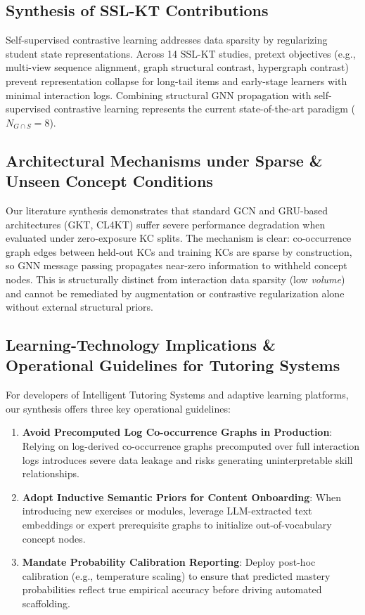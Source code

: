 \documentclass[journal]{IEEEtran}
\begin{document}
\subsection{Synthesis of SSL-KT Contributions}
Self-supervised contrastive learning addresses data sparsity by regularizing student state representations. Across 14 SSL-KT studies, pretext objectives (e.g., multi-view sequence alignment, graph structural contrast, hypergraph contrast) prevent representation collapse for long-tail items and early-stage learners with minimal interaction logs. Combining structural GNN propagation with self-supervised contrastive learning represents the current state-of-the-art paradigm ($N_{G \cap S} = 8$).

\subsection{Architectural Mechanisms under Sparse \& Unseen Concept Conditions}
Our literature synthesis demonstrates that standard GCN and GRU-based architectures (GKT, CL4KT) suffer severe performance degradation when evaluated under zero-exposure KC splits. The mechanism is clear: co-occurrence graph edges between held-out KCs and training KCs are sparse by construction, so GNN message passing propagates near-zero information to withheld concept nodes. This is structurally distinct from interaction data sparsity (low \emph{volume}) and cannot be remediated by augmentation or contrastive regularization alone without external structural priors.

\subsection{Learning-Technology Implications \& Operational Guidelines for Tutoring Systems}
For developers of Intelligent Tutoring Systems and adaptive learning platforms, our synthesis offers three key operational guidelines:
\begin{enumerate}
    \item \textbf{Avoid Precomputed Log Co-occurrence Graphs in Production}: Relying on log-derived co-occurrence graphs precomputed over full interaction logs introduces severe data leakage and risks generating uninterpretable skill relationships.
    \item \textbf{Adopt Inductive Semantic Priors for Content Onboarding}: When introducing new exercises or modules, leverage LLM-extracted text embeddings or expert prerequisite graphs to initialize out-of-vocabulary concept nodes.
    \item \textbf{Mandate Probability Calibration Reporting}: Deploy post-hoc calibration (e.g., temperature scaling) to ensure that predicted mastery probabilities reflect true empirical accuracy before driving automated scaffolding.
\end{enumerate}
\end{document}
